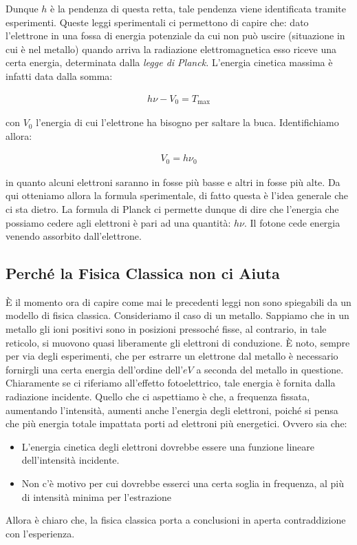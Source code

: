	Dunque $h$ è la pendenza di questa retta, tale pendenza viene identificata tramite esperimenti. Queste leggi sperimentali ci permettono di capire che: dato l'elettrone in una fossa di energia potenziale da cui non può uscire (situazione in cui è nel metallo) quando arriva la radiazione elettromagnetica esso riceve una certa energia, determinata dalla \textit{legge di Planck.} L'energia cinetica massima è infatti data dalla somma:

\begin{align*}
	h \nu - V_0 = T_{\text{max}}
\end{align*}
	
	con $V_0$ l'energia di cui l'elettrone ha bisogno per saltare la buca. Identifichiamo allora:
	
\begin{align*}
	V_0 = h \nu_0
\end{align*}

	in quanto alcuni elettroni saranno in fosse più basse e altri in fosse più alte. Da qui otteniamo allora la formula sperimentale, di fatto questa è l'idea generale che ci sta dietro. La formula di Planck ci permette dunque di dire che l'energia che possiamo cedere agli elettroni è pari ad una quantità: $h\nu$. Il fotone cede energia venendo assorbito dall'elettrone.

\subsection{Perché la Fisica Classica non ci Aiuta}

	È il momento ora di capire come mai le precedenti leggi non sono spiegabili da un modello di fisica classica. Consideriamo il caso di un metallo. Sappiamo che in un metallo gli ioni positivi sono in posizioni pressoché fisse, al contrario, in tale reticolo, si muovono quasi liberamente gli elettroni di conduzione. È noto, sempre per via degli esperimenti, che per estrarre un elettrone dal metallo è necessario fornirgli una certa energia dell'ordine dell'$eV$ a seconda del metallo in questione. Chiaramente se ci riferiamo all'effetto fotoelettrico, tale energia è fornita dalla radiazione incidente. Quello che ci aspettiamo è che, a frequenza fissata, aumentando l'intensità, aumenti anche l'energia degli elettroni, poiché si pensa che più energia totale impattata porti ad elettroni più energetici. Ovvero sia che:
\begin{itemize}
	\item L'energia cinetica degli elettroni dovrebbe essere una funzione lineare dell'intensità incidente.
	\item Non c'è motivo per cui dovrebbe esserci una certa soglia in frequenza, al più di intensità minima per l'estrazione
\end{itemize}
	Allora è chiaro che, la fisica classica porta a conclusioni in aperta contraddizione con l'esperienza.

